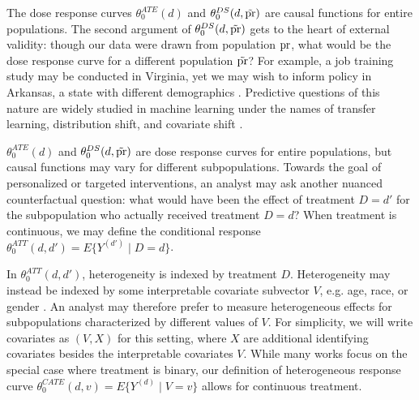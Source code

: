 The  dose response curves $\theta_0^{ATE}(d)$ and $\theta_0^{DS}(d,\tilde{\text{\normalfont pr}})$ are causal functions for entire populations. 
 The second argument of $\theta_0^{DS}(d,\tilde{\text{\normalfont pr}})$ gets to the heart of external validity: though our data were drawn from population $\text{\normalfont pr}$, what would be the dose response curve for a different population $\tilde{\text{\normalfont pr}}$? For example, a job training study may be conducted in Virginia, yet we may wish to inform policy in Arkansas, a state with different demographics \cite{hotz2005predicting}. 
Predictive questions of this nature are widely studied in machine learning under the names of transfer learning, distribution shift, and covariate shift \cite{quinonero2009dataset}.

$\theta_0^{ATE}(d)$ and $\theta_0^{DS}(d,\tilde{\text{\normalfont pr}})$ are dose response curves for entire populations, but causal functions may vary for different subpopulations. Towards the goal of personalized or targeted interventions, an analyst may ask another nuanced counterfactual question: what would have been the effect of treatment $D=d'$ for the subpopulation who actually received treatment $D=d$? When treatment is continuous, we may define the conditional response $ \theta_0^{ATT}(d,d')=E\{Y^{(d')} \mid D=d\}$. %

In $\theta_0^{ATT}(d,d')$, heterogeneity is indexed by treatment $D$. Heterogeneity may instead be indexed by some interpretable covariate subvector $V$, e.g. age, race, or gender \cite{abrevaya2015estimating}. An analyst may therefore prefer to measure heterogeneous effects for subpopulations characterized by different values of $V$. For simplicity, we will write covariates as $(V,X)$ for this setting, where $X$ are additional identifying covariates besides the interpretable covariates $V$. While many works focus on the special case where treatment is binary, our definition of heterogeneous response curve $\theta_0^{CATE}(d,v)=E\{Y^{(d)} \mid V=v\}$ allows for continuous treatment.


